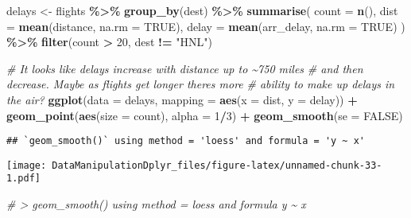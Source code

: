 \documentclass[
]{article}
\newenvironment{Shaded}{\begin{snugshade}}{\end{snugshade}}
\newcommand{\AttributeTok}[1]{\textcolor[rgb]{0.13,0.29,0.53}{#1}}
\newcommand{\CommentTok}[1]{\textcolor[rgb]{0.56,0.35,0.01}{\textit{#1}}}
\newcommand{\ConstantTok}[1]{\textcolor[rgb]{0.56,0.35,0.01}{#1}}
\newcommand{\DecValTok}[1]{\textcolor[rgb]{0.00,0.00,0.81}{#1}}
\newcommand{\FunctionTok}[1]{\textcolor[rgb]{0.13,0.29,0.53}{\textbf{#1}}}
\newcommand{\NormalTok}[1]{#1}
\newcommand{\OtherTok}[1]{\textcolor[rgb]{0.56,0.35,0.01}{#1}}
\newcommand{\SpecialCharTok}[1]{\textcolor[rgb]{0.81,0.36,0.00}{\textbf{#1}}}
\newcommand{\StringTok}[1]{\textcolor[rgb]{0.31,0.60,0.02}{#1}}
\begin{document}
\begin{Shaded}
\begin{Highlighting}[]
\NormalTok{delays }\OtherTok{\textless{}{-}}\NormalTok{ flights }\SpecialCharTok{\%\textgreater{}\%} 
            \FunctionTok{group\_by}\NormalTok{(dest) }\SpecialCharTok{\%\textgreater{}\%} 
            \FunctionTok{summarise}\NormalTok{(}
              \AttributeTok{count =} \FunctionTok{n}\NormalTok{(),}
              \AttributeTok{dist =} \FunctionTok{mean}\NormalTok{(distance, }\AttributeTok{na.rm =} \ConstantTok{TRUE}\NormalTok{),}
              \AttributeTok{delay =} \FunctionTok{mean}\NormalTok{(arr\_delay, }\AttributeTok{na.rm =} \ConstantTok{TRUE}\NormalTok{)}
\NormalTok{            ) }\SpecialCharTok{\%\textgreater{}\%} 
               \FunctionTok{filter}\NormalTok{(count }\SpecialCharTok{\textgreater{}} \DecValTok{20}\NormalTok{, dest }\SpecialCharTok{!=} \StringTok{"HNL"}\NormalTok{)}

\CommentTok{\# It looks like delays increase with distance up to \textasciitilde{}750 miles }
\CommentTok{\# and then decrease. Maybe as flights get longer there\textquotesingle{}s more }
\CommentTok{\# ability to make up delays in the air?}
\FunctionTok{ggplot}\NormalTok{(}\AttributeTok{data =}\NormalTok{ delays, }\AttributeTok{mapping =} \FunctionTok{aes}\NormalTok{(}\AttributeTok{x =}\NormalTok{ dist, }\AttributeTok{y =}\NormalTok{ delay)) }\SpecialCharTok{+}
  \FunctionTok{geom\_point}\NormalTok{(}\FunctionTok{aes}\NormalTok{(}\AttributeTok{size =}\NormalTok{ count), }\AttributeTok{alpha =} \DecValTok{1}\SpecialCharTok{/}\DecValTok{3}\NormalTok{) }\SpecialCharTok{+}
  \FunctionTok{geom\_smooth}\NormalTok{(}\AttributeTok{se =} \ConstantTok{FALSE}\NormalTok{)}
\end{Highlighting}
\end{Shaded}

\begin{verbatim}
## `geom_smooth()` using method = 'loess' and formula = 'y ~ x'
\end{verbatim}

\texttt{[image: DataManipulationDplyr\_files/figure-latex/unnamed-chunk-33-1.pdf]}

\begin{Shaded}
\begin{Highlighting}[]
\CommentTok{\# \textgreater{} \textasciigrave{}geom\_smooth()\textasciigrave{} using method = \textquotesingle{}loess\textquotesingle{} and formula \textquotesingle{}y \textasciitilde{} x\textquotesingle{}}
\end{Highlighting}
\end{Shaded}
\end{document}
